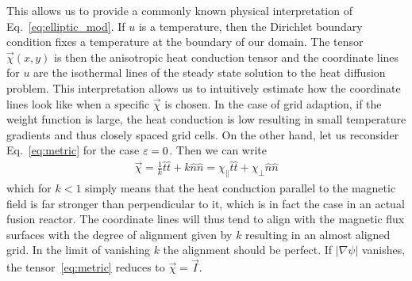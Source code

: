 This allows us to provide a commonly known physical interpretation of Eq.~\eqref{eq:elliptic_mod}.
If $u$ is a temperature, then the Dirichlet boundary condition 
fixes a temperature at the boundary of our domain. The tensor $\vec \chi(x,y)$ is 
then the anisotropic heat conduction tensor and the coordinate lines for $u$ are 
the isothermal lines of the steady state solution to the heat diffusion problem. 
This interpretation allows us to intuitively estimate how the
coordinate lines look like when a specific $\vec\chi$ is chosen. 
In the case of grid adaption, if the weight function is large, the heat conduction 
is low resulting in small temperature gradients and thus closely spaced grid cells. 
On the other hand, let us reconsider Eq.~\eqref{eq:metric} for the case $\varepsilon=0$. 
Then we can write 
\begin{align}
\vec \chi = \frac{1}{k}\hat t\hat t + k \hat n\hat n 
= \chi_\parallel \hat t \hat t + \chi_\perp \hat n \hat n
  \label{eq:heat_conduction}
\end{align}
which for $k<1$ simply means that the heat conduction parallel to the magnetic field
is far stronger than perpendicular to it, which is in fact the case in an actual 
fusion reactor. 
The coordinate lines will thus tend to align with the magnetic flux
surfaces with the degree of alignment given by $k$ resulting 
in an almost aligned grid. 
In the limit of vanishing $k$ the alignment should be perfect. 
If $|\nabla\psi|$ vanishes, the tensor~\eqref{eq:metric} reduces to $\vec \chi = \vec I$.


